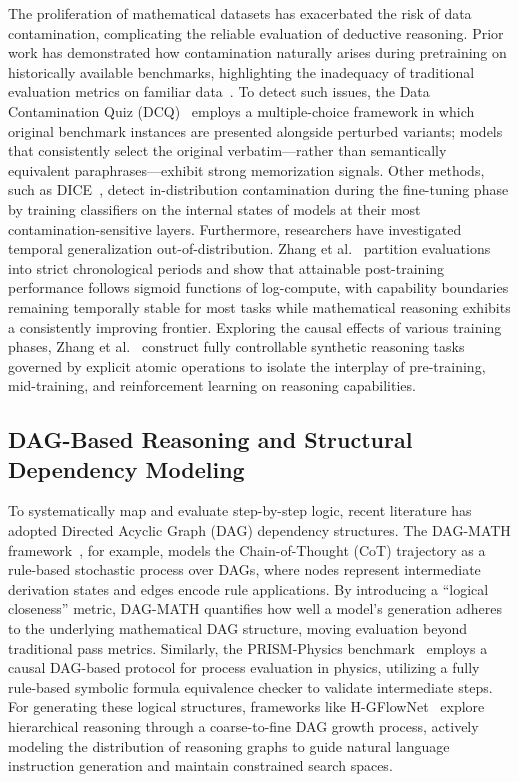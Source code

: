 \documentclass{article} %
\begin{document}
The proliferation of mathematical datasets has exacerbated the risk of data contamination, complicating the reliable evaluation of deductive reasoning. Prior work has demonstrated how contamination naturally arises during pretraining on historically available benchmarks, highlighting the inadequacy of traditional evaluation metrics on familiar data~\cite{jiang2024contamination}. To detect such issues, the Data Contamination Quiz (DCQ)~\cite{golchin2023dcq} employs a multiple-choice framework in which original benchmark instances are presented alongside perturbed variants; models that consistently select the original verbatim---rather than semantically equivalent paraphrases---exhibit strong memorization signals. Other methods, such as DICE~\cite{tu2024dice}, detect in-distribution contamination during the fine-tuning phase by training classifiers on the internal states of models at their most contamination-sensitive layers. Furthermore, researchers have investigated temporal generalization out-of-distribution. Zhang et al.~\cite{zhang2026prescriptive} partition evaluations into strict chronological periods and show that attainable post-training performance follows sigmoid functions of log-compute, with capability boundaries remaining temporally stable for most tasks while mathematical reasoning exhibits a consistently improving frontier. Exploring the causal effects of various training phases, Zhang et al.~\cite{zhang2025interplay} construct fully controllable synthetic reasoning tasks governed by explicit atomic operations to isolate the interplay of pre-training, mid-training, and reinforcement learning on reasoning capabilities.

\subsection{DAG-Based Reasoning and Structural Dependency Modeling}

To systematically map and evaluate step-by-step logic, recent literature has adopted Directed Acyclic Graph (DAG) dependency structures. The DAG-MATH framework~\cite{zhang2025dagmath}, for example, models the Chain-of-Thought (CoT) trajectory as a rule-based stochastic process over DAGs, where nodes represent intermediate derivation states and edges encode rule applications. By introducing a ``logical closeness'' metric, DAG-MATH quantifies how well a model's generation adheres to the underlying mathematical DAG structure, moving evaluation beyond traditional pass metrics. Similarly, the PRISM-Physics benchmark~\cite{zhao2025prism} employs a causal DAG-based protocol for process evaluation in physics, utilizing a fully rule-based symbolic formula equivalence checker to validate intermediate steps. For generating these logical structures, frameworks like H-GFlowNet~\cite{bu2025hgflownet} explore hierarchical reasoning through a coarse-to-fine DAG growth process, actively modeling the distribution of reasoning graphs to guide natural language instruction generation and maintain constrained search spaces.
\end{document}
